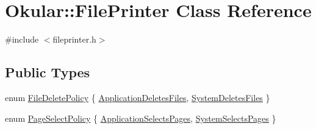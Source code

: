 \hypertarget{classOkular_1_1FilePrinter}{\section{Okular\+:\+:File\+Printer Class Reference}
\label{classOkular_1_1FilePrinter}
}


{\ttfamily \#include $<$fileprinter.\+h$>$}

\subsection*{Public Types}
\begin{DoxyCompactItemize}
\item 
enum \hyperlink{classOkular_1_1FilePrinter_acd01eb48e99f9289a7f4786a366ef7ba}{File\+Delete\+Policy} \{ \hyperlink{classOkular_1_1FilePrinter_acd01eb48e99f9289a7f4786a366ef7baa3dc2e24676385e73e2e9f623c49cc94a}{Application\+Deletes\+Files}, 
\hyperlink{classOkular_1_1FilePrinter_acd01eb48e99f9289a7f4786a366ef7baa86d9b928c2434b89a15de26c8cc22705}{System\+Deletes\+Files}
 \}
\item 
enum \hyperlink{classOkular_1_1FilePrinter_a755b647910344031db1d79312482981d}{Page\+Select\+Policy} \{ \hyperlink{classOkular_1_1FilePrinter_a755b647910344031db1d79312482981da3910c7efe4c8f4f8a69459765bea25a4}{Application\+Selects\+Pages}, 
\hyperlink{classOkular_1_1FilePrinter_a755b647910344031db1d79312482981dad7061722165845cb9b893916a6442797}{System\+Selects\+Pages}
 \}
\end{DoxyCompactItemize}
